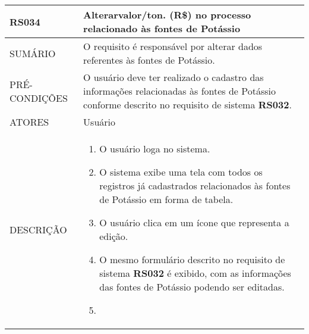 \begin{longtable}[c]{@{}|p{4cm}|p{9cm}|@{}}
\hline
\begin{minipage}[t]{0.47\columnwidth}
\textbf{RS034}
\end{minipage} & \begin{minipage}[t]{0.47\columnwidth}
Alterarvalor/ton. (R\$) no processo relacionado às fontes de Potássio
\end{minipage}
\\\hline
\begin{minipage}[t]{0.47\columnwidth}
SUMÁRIO
\end{minipage} & \begin{minipage}[t]{0.47\columnwidth}
O requisito é responsável por alterar dados referentes às fontes de
Potássio.
\end{minipage}
\\\hline
\begin{minipage}[t]{0.47\columnwidth}
PRÉ-CONDIÇÕES
\end{minipage} & \begin{minipage}[t]{0.47\columnwidth}
O usuário deve ter realizado o cadastro das informações relacionadas às
fontes de Potássio conforme descrito no requisito de sistema \textbf{RS032}.
\end{minipage}
\\\hline
\begin{minipage}[t]{0.47\columnwidth}
ATORES
\end{minipage} & \begin{minipage}[t]{0.47\columnwidth}
Usuário
\end{minipage}
\\\hline
\begin{minipage}[t]{0.47\columnwidth}
DESCRIÇÃO
\end{minipage} & \begin{minipage}[t]{0.47\columnwidth}
\begin{enumerate}
\def\labelenumi{\arabic{enumi}.}
\itemsep1pt\parskip0pt\parsep0pt
\item
  O usuário loga no sistema.
\item
  O sistema exibe uma tela com todos os registros já cadastrados
  relacionados às fontes de Potássio em forma de tabela.
\item
  O usuário clica em um ícone que representa a edição.
\item
  O mesmo formulário descrito no requisito de sistema \textbf{RS032} é exibido,
  com as informações das fontes de Potássio podendo ser editadas.
\item

\end{enumerate}
\end{minipage}
\end{longtable}
